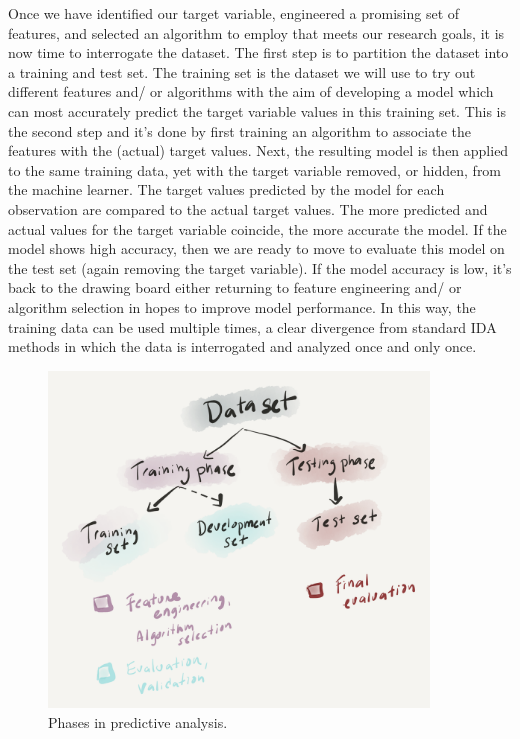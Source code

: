 \documentclass[
  letterpaper,
]{latex/krantz}
\begin{document}
Once we have identified our target variable, engineered a promising set
of features, and selected an algorithm to employ that meets our research
goals, it is now time to interrogate the dataset. The first step is to
partition the dataset into a training and test set. The training set is
the dataset we will use to try out different features and/ or algorithms
with the aim of developing a model which can most accurately predict the
target variable values in this training set. This is the second step and
it's done by first training an algorithm to associate the features with
the (actual) target values. Next, the resulting model is then applied to
the same training data, yet with the target variable removed, or hidden,
from the machine learner. The target values predicted by the model for
each observation are compared to the actual target values. The more
predicted and actual values for the target variable coincide, the more
accurate the model. If the model shows high accuracy, then we are ready
to move to evaluate this model on the test set (again removing the
target variable). If the model accuracy is low, it's back to the drawing
board either returning to feature engineering and/ or algorithm
selection in hopes to improve model performance. In this way, the
training data can be used multiple times, a clear divergence from
standard IDA methods in which the data is interrogated and analyzed once
and only once.

\begin{figure}[h]

{\centering \includegraphics[width=0.9\textwidth,height=\textheight]{./figures/approaching-analysis/predictive-phases.png}

}

\caption{\label{fig-aa-predictive-phases}Phases in predictive analysis.}

\end{figure}
\end{document}
